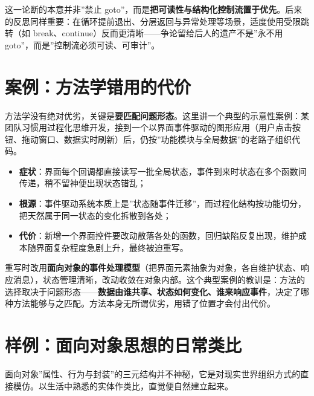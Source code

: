 \documentclass[
]{ctexbook}
\providecommand{\tightlist}{\setlength{\itemsep}{0pt}\setlength{\parskip}{0pt} }
\begin{document}
这一论断的本意并非''禁止
goto''，而是\textbf{把可读性与结构化控制流置于优先}。后来的反思同样重要：在循环提前退出、分层返回与异常处理等场景，适度使用受限跳转（如
break、continue）反而更清晰------争论留给后人的遗产不是''永不用
goto''，而是''控制流必须可读、可审计''。

\section{案例：方法学错用的代价}\label{ux6848ux4f8bux65b9ux6cd5ux5b66ux9519ux7528ux7684ux4ee3ux4ef7}

方法学没有绝对优劣，关键是\textbf{要匹配问题形态}。这里讲一个典型的示意性案例：某团队习惯用过程化思维开发，接到一个以界面事件驱动的图形应用（用户点击按钮、拖动窗口、数据实时刷新）后，仍按''功能模块与全局数据''的老路子组织代码。

\begin{itemize}
\tightlist
\item
  \textbf{症状}：界面每个回调都直接读写一批全局状态，事件到来时状态在多个函数间传递，稍不留神便出现状态错乱；
\item
  \textbf{根源}：事件驱动系统本质上是''状态随事件迁移''，而过程化结构按功能切分，把天然属于同一状态的变化拆散到各处；
\item
  \textbf{代价}：新增一个界面控件要改动散落各处的函数，回归缺陷反复出现，维护成本随界面复杂程度急剧上升，最终被迫重写。
\end{itemize}

重写时改用\textbf{面向对象的事件处理模型}（把界面元素抽象为对象，各自维护状态、响应消息），状态管理清晰，改动收敛在对象内部。这个典型案例的教训是：方法的选择取决于问题形态------\textbf{数据由谁共享、状态如何变化、谁来响应事件}，决定了哪种方法能够与之匹配。方法本身无所谓优劣，用错了位置才会付出代价。

\section{样例：面向对象思想的日常类比}\label{ux6837ux4f8bux9762ux5411ux5bf9ux8c61ux601dux60f3ux7684ux65e5ux5e38ux7c7bux6bd4}

面向对象''属性、行为与封装''的三元结构并不神秘，它是对现实世界组织方式的直接模仿。以生活中熟悉的实体作类比，直觉便自然建立起来。
\end{document}

